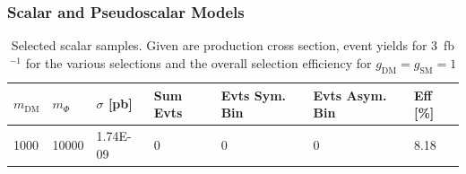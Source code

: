 \clearpage
\subsubsection{Scalar and Pseudoscalar Models} \label{sec:dm_pscalar}

\begin{table}[h!]
\small
\centering
\begin{tabular}{lllllll}
\hline
$m_\textrm{DM}$ & $m_\Phi$ & $\sigma$ [pb] & Sum Evts       & Evts Sym. Bin & Evts Asym. Bin & Eff  [\%]   \\\hline
1000  &  10000 & 1.74E-09 & 0      & 0      & 0      & 8.18 \\

\hline
\end{tabular}
\caption{Selected scalar samples. Given are production cross section, event yields for 3~fb$^{-1 }$ for the various selections and the overall selection efficiency for $g_\textrm{DM}=g_\textrm{SM}=1$}
\label{tab:dm_S_g1_3fb}
\end{table}


